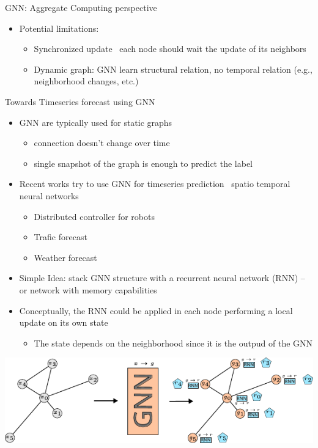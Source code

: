 \documentclass[presentation, 9pt]{beamer}\mode<presentation>{\usetheme{AMSBolognaFC}}
\begin{document}
\begin{frame}{GNN: Aggregate Computing perspective}
\begin{itemize}
\begin{itemize}
				\item Train a GNN on the gathered graphs
				\item `Deploy' the GNN on the aggregate systems
				\begin{itemize}
					\item Each node executes the GNN locally sharing the same parameters (homegenous behaviour)
				\end{itemize}
			\end{itemize}
			\item Potential limitations:
			\begin{itemize}
				\item Synchronized update \faArrowRight \, each node should wait the update of its neighbors
				\item Dynamic graph: GNN learn structural relation, no temporal relation (e.g., neighborhood changes, etc.)
			\end{itemize}
		\end{itemize}
\end{frame}
\begin{frame}[fragile]{Towards Timeseries forecast using GNN}
\begin{itemize}
	\item GNN are typically used for static graphs
	\begin{itemize}
		\item connection doesn't change over time
		\item single snapshot of the graph is enough to predict the label
	\end{itemize}
	\item Recent works try to use GNN for timeseries prediction \faArrowRight \, spatio temporal neural networks
	\begin{itemize}
		\item Distributed controller for robots ~
		\item Trafic forecast~
		\item Weather forecast~
	\end{itemize}
	\item Simple Idea: stack GNN structure with a recurrent neural network (RNN) -- or network with memory capabilities
	\item Conceptually, the RNN could be applied in each node performing a local update on its own state
	\begin{itemize}
		\item The state depends on the neighborhood since it is the outpud of the GNN
	\end{itemize}	
	\centering
\end{itemize}
\includegraphics[width=\textwidth]{img/idea.pdf}

\end{frame}
\end{document}
